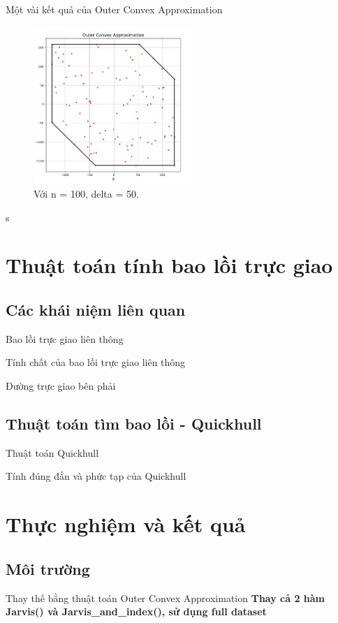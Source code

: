 \documentclass[11pt]{beamer}
\theoremstyle{definition}
\theoremstyle{plain}
\theoremstyle{plain}
\theoremstyle{remark}
\begin{document}
	\begin{frame}{Một vài kết quả của Outer Convex Approximation}
		\begin{figure}
			\begin{center}
				\includegraphics[width=6cm]{./result_outer_cv_delta50.jpg}
				\caption{Với n = 100, delta = 50.}
				\label{result_outer_cv_delta50}
			\end{center}
		\end{figure}
		s
	\end{frame}
	\section{Thuật toán tính bao lồi trực giao}
	\subsection{Các khái niệm liên quan}
	\begin{frame}{Bao lồi trực giao liên thông}
		
	\end{frame}
	\begin{frame}{Tính chất của bao lồi trực giao liên thông}
		
	\end{frame}
	\begin{frame}{Đường trực giao bên phải}
		
	\end{frame}
	
	\subsection{Thuật toán tìm bao lồi - Quickhull}
	\begin{frame}{ Thuật toán Quickhull}
		
	\end{frame}
	\begin{frame}{Tính đúng đắn và phức tạp của Quickhull}
		
	\end{frame}
	\section{Thực nghiệm và kết quả}
	\subsection{Môi trường}
	\begin{frame}{Thay thế bằng thuật toán Outer Convex Approximation}
		\textbf{Thay cả 2 hàm Jarvis() và Jarvis\_and\_index(), sử dụng full dataset}
	\end{frame}
	
\end{document}
